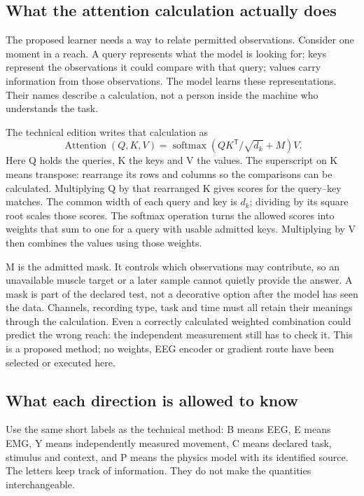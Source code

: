 \subsection{What the attention calculation actually does}

The proposed learner needs a way to relate permitted observations. Consider
one moment in a reach. A query represents what the model is looking for;
keys represent the observations it could compare with that query; values
carry information from those observations. The model learns these
representations. Their names describe a calculation, not a person inside the
machine who understands the task.

The technical edition writes that calculation as
\[\operatorname{Attention}(Q,K,V)=\operatorname{softmax}\!\left(QK^{\mathsf{T}}/\sqrt{d_k}+M\right)V.\]
Here Q holds the queries, K the keys and V the values. The superscript on K
means transpose: rearrange its rows and columns so the comparisons can be
calculated. Multiplying Q by that rearranged K gives scores for the
query--key matches. The common width of each query and key is $d_k$; dividing
by its square root scales those scores. The softmax operation turns the
allowed scores into weights that sum to one for a query with usable admitted
keys. Multiplying by V then combines the values using those weights.

M is the admitted mask. It controls which observations may contribute, so
an unavailable muscle target or a later sample cannot quietly provide the
answer. A mask is part of the declared test, not a decorative option after
the model has seen the data. Channels, recording type, task and time must all
retain their meanings through the calculation. Even a correctly calculated
weighted combination could predict the wrong reach: the independent
measurement still has to check it. This is a proposed method; no weights,
EEG encoder or gradient route have been selected or executed here.

\subsection{What each direction is allowed to know}

Use the same short labels as the technical method: B means EEG, E means
EMG, Y means independently measured movement, C means declared task,
stimulus and context, and P means the physics model with its identified
source. The letters keep track of information. They do not make the
quantities interchangeable.

